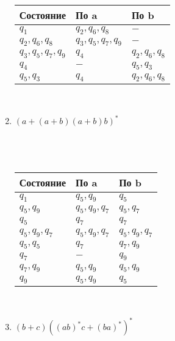 \documentclass{article}
\begin{document}
\begin{enumerate}
\begin{tabular} { | l | l | l | }
                Состояние & По a & По b \\ \hline
                \(q_1\) & \( q_2, q_6, q_8\) & \(-\) \\ \hline
                \(q_2, q_6, q_8\) & \(q_3, q_5, q_7, q_9\) & \( -\) \\ \hline
                \(q_3, q_5, q_7, q_9\) & \( q_4\) & \(q_2, q_6, q_8\) \\ \hline
                \(q_4\) & \( -\) & \(q_5, q_3\) \\ \hline
                \(q_5, q_3\) & \( q_4\) & \(q_2, q_6, q_8\) \\ 
                \hline
            \end{tabular} \\
            \LARGE
            \item \((a+(a+b)(a+b)b)^* \) \\
            \\
            \hspace*{-20mm}{Построим НКА.}\\
            \hspace*{-20mm}{Преобразуем в минимальный ДКА.}\\
            \begin{tabular} { | l | l | l | }
                \hline 
                Состояние & По a & По b \\ \hline
                \(q_1\) & \( q_5, q_9\) & \(q_5\) \\ \hline
                \(q_5, q_9\) & \(q_5, q_9, q_7\) & \( q_5, q_7\) \\ \hline
                \(q_5\) & \( q_7\) & \(q_7\) \\ \hline
                \(q_5, q_9, q_7\) & \( q_5, q_9, q_7\) & \(q_5, q_9, q_7\) \\ \hline
                \(q_5, q_5\) & \( q_7\) & \(q_7, q_9\) \\ \hline
                \(q_7\) & \( -\) & \(q_9\) \\ \hline
                \(q_7, q_9\) & \( q_5, q_9\) & \(q_5, q_9\) \\ \hline
                \(q_9\) & \( q_5, q_9\) & \(q_5\) \\ 
                \hline
            \end{tabular} \\
            \LARGE
            \item \((b+c)((ab)^*c+(ba)^*)^* \) \\

\end{enumerate}
\end{document}
